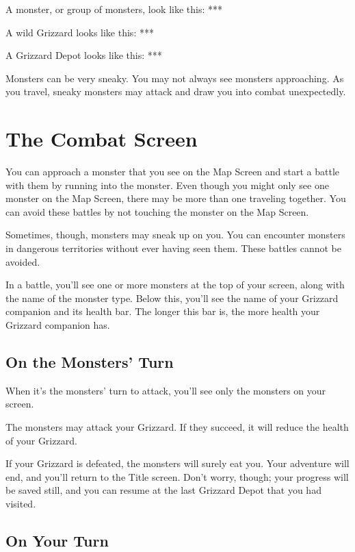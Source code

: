 \documentclass[12pt,twoside,openright,book]{memoir}
\begin{document}
A monster, or group of monsters, look like this: ***

A wild Grizzard looks like this: ***

A Grizzard Depot looks like this: ***

Monsters   can    be   very   sneaky.    You   may   not    always   see
monsters approaching. As you travel, sneaky monsters may attack and draw
you into combat unexpectedly.

\section{The Combat Screen}

You can approach a monster that you see on the Map Screen and start a
battle with them by running into the monster. Even though you might
only see one monster on the Map Screen, there may be more than one
traveling together. You can avoid these battles by not touching the
monster on the Map Screen.

Sometimes,  though, monsters  may sneak  up  on you.  You can  encounter
monsters  in  dangerous  territories  without  ever  having  seen  them.
These battles cannot be avoided.

In a battle, you'll see one or  more monsters at the top of your screen,
along with the name of the monster type. Below this, you'll see the name
of your Grizzard  companion and its health bar. The  longer this bar is,
the more health your Grizzard companion has.

\subsection{On the Monsters' Turn}

When it's the monsters' turn to attack, you'll see only the monsters
on your screen.

The monsters may  attack your Grizzard. If they succeed,  it will reduce
the health of your Grizzard.

If  your  Grizzard  is  defeated,  the monsters  will  surely  eat  you.
Your  adventure  will  end,  and  you'll return  to  the  Title  screen.
Don't worry,  though; your  progress will  be saved  still, and  you can
resume at the last Grizzard Depot that you had visited.

\subsection{On Your Turn}
\end{document}

